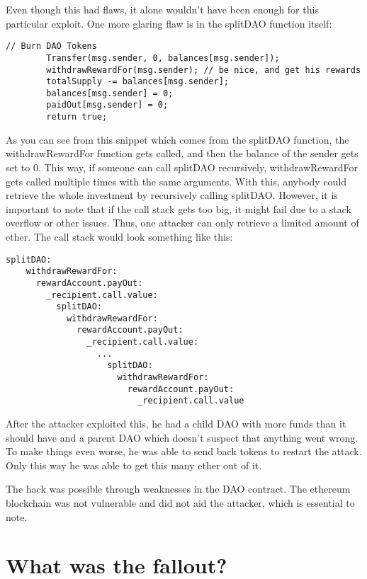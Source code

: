 \documentclass[a4paper, 11pt]{scrartcl}
\begin{document}
Even though this had flaws, it alone wouldn't have been enough for this particular exploit. One more glaring flaw is in the splitDAO function itself: \cite{deconstructingDaoAttack}

\begin{lstlisting}[language=Solidity]
        // Burn DAO Tokens
        Transfer(msg.sender, 0, balances[msg.sender]);
        withdrawRewardFor(msg.sender); // be nice, and get his rewards
        totalSupply -= balances[msg.sender];
        balances[msg.sender] = 0;
        paidOut[msg.sender] = 0;
        return true;
\end{lstlisting}

As you can see from this snippet which comes from the splitDAO function, the withdrawRewardFor function gets called, and then the balance of the sender gets set to 0. This way, if someone can call splitDAO recursively, withdrawRewardFor gets called multiple times with the same arguments. With this, anybody could retrieve the whole investment by recursively calling splitDAO. However, it is important to note that if the call stack gets too big, it might fail due to a stack overflow or other issues. Thus, one attacker can only retrieve a limited amount of ether. The call stack would look something like this: \cite{deconstructingDaoAttack}

\begin{lstlisting}[language=Solidity]
  splitDAO:
    withdrawRewardFor:
      rewardAccount.payOut:
        _recipient.call.value:
          splitDAO:
            withdrawRewardFor:
              rewardAccount.payOut:
                _recipient.call.value:
                  ...  
                    splitDAO:
                      withdrawRewardFor:
                        rewardAccount.payOut:
                          _recipient.call.value
\end{lstlisting}

After the attacker exploited this, he had a child DAO with more funds than it should have and a parent DAO which doesn't suspect that anything went wrong. To make things even worse, he was able to send back tokens to restart the attack. Only this way he was able to get this many ether out of it. \cite{deconstructingDaoAttack}

The hack was possible through weaknesses in the DAO contract. The ethereum blockchain was not vulnerable and did not aid the attacker, which is essential to note. 

\section{What was the fallout?}
\end{document}
